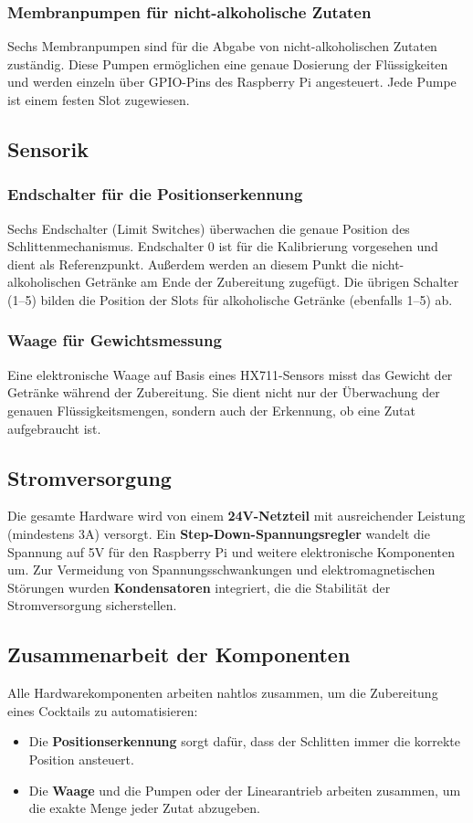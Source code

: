 \subsubsection{Membranpumpen für nicht-alkoholische Zutaten}
Sechs Membranpumpen sind für die Abgabe von nicht-alkoholischen Zutaten zuständig. Diese Pumpen ermöglichen eine genaue Dosierung der Flüssigkeiten und werden einzeln über GPIO-Pins des Raspberry Pi angesteuert. Jede Pumpe ist einem festen Slot zugewiesen.

\subsection{Sensorik}
\subsubsection{Endschalter für die Positionserkennung}
Sechs Endschalter (Limit Switches) überwachen die genaue Position des Schlittenmechanismus. Endschalter 0 ist für die Kalibrierung vorgesehen und dient als Referenzpunkt. Außerdem werden an diesem Punkt die nicht-alkoholischen Getränke am Ende der Zubereitung zugefügt. Die übrigen Schalter (1--5) bilden die Position der Slots für alkoholische Getränke (ebenfalls 1--5) ab.

\subsubsection{Waage für Gewichtsmessung}
Eine elektronische Waage auf Basis eines HX711-Sensors misst das Gewicht der Getränke während der Zubereitung. Sie dient nicht nur der Überwachung der genauen Flüssigkeitsmengen, sondern auch der Erkennung, ob eine Zutat aufgebraucht ist.

\subsection{Stromversorgung}
Die gesamte Hardware wird von einem \textbf{24V-Netzteil} mit ausreichender Leistung (mindestens 3A) versorgt. Ein \textbf{Step-Down-Spannungsregler} wandelt die Spannung auf 5V für den Raspberry Pi und weitere elektronische Komponenten um. Zur Vermeidung von Spannungsschwankungen und elektromagnetischen Störungen wurden \textbf{Kondensatoren} integriert, die die Stabilität der Stromversorgung sicherstellen.

\subsection{Zusammenarbeit der Komponenten}
Alle Hardwarekomponenten arbeiten nahtlos zusammen, um die Zubereitung eines Cocktails zu automatisieren:
\begin{itemize}
    \item Die \textbf{Positionserkennung} sorgt dafür, dass der Schlitten immer die korrekte Position ansteuert.
    \item Die \textbf{Waage} und die Pumpen oder der Linearantrieb arbeiten zusammen, um die exakte Menge jeder Zutat abzugeben.
\end{itemize}


